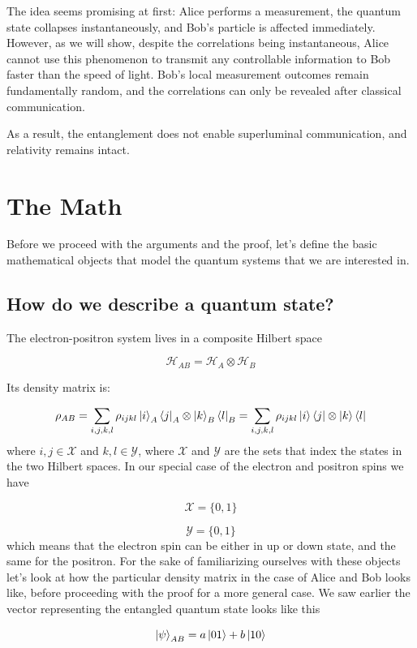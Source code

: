 \documentclass[11pt,a4paper]{article}
\begin{document}
The idea seems promising at first: Alice performs a measurement, the quantum state collapses
instantaneously, and Bob’s particle is affected immediately. However, as we will show, despite
the correlations being instantaneous, Alice cannot use this phenomenon to transmit any controllable
information to Bob faster than the speed of light. Bob’s local measurement outcomes remain
fundamentally random, and the correlations can only be revealed after classical communication.

As a result, the entanglement does not enable superluminal communication, and relativity remains intact.

\section{The Math}

Before we proceed with the arguments and the proof, let's define the basic mathematical objects that model
the quantum systems that we are interested in.

\subsection{How do we describe a quantum state?}

The electron-positron system lives in a composite Hilbert space

\[
\mathcal{H}_{AB} = \mathcal{H}_A \otimes \mathcal{H}_B
\]

Its density matrix is:

\[
 \rho_{AB} = \sum_{i, j, k, l} \rho_{ijkl} \ket{i}_A\bra{j}_A \otimes \ket{k}_B\bra{l}_B =
 \sum_{i, j, k, l} \rho_{ijkl} \ket{i}\bra{j} \otimes \ket{k}\bra{l}
\]
where $i, j \in \mathcal{X} $ and  $k, l \in \mathcal{Y} $, where $\mathcal{X}$ and $\mathcal{Y}$
are the sets that index the states in the two Hilbert spaces. In our special case of the electron and
positron spins we have

\[
 \mathcal{X} = \{0, 1\}
\]

\[
 \mathcal{Y} = \{0, 1\}
\]
which means that the electron spin can be either in up or down state, and the same for the positron.
For the sake of familiarizing ourselves with these objects let's look at how the particular density
matrix in the case of Alice and Bob looks like, before proceeding with the proof for a more general
case. We saw earlier the vector representing the entangled quantum state looks like this

\[
\ket{\psi}_{AB} = a\ket{01} + b\ket{10}
\]
\end{document}
